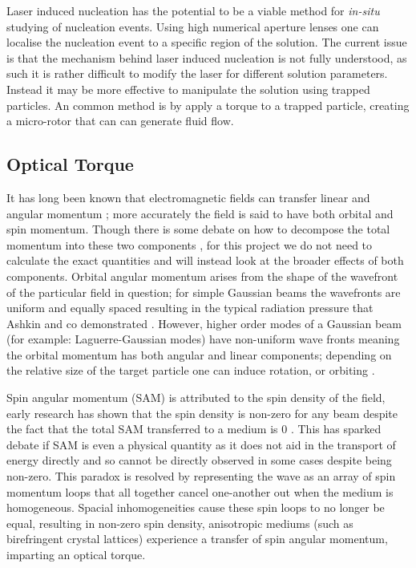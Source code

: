 Laser induced nucleation has the potential to be a viable method 
for \textit{in-situ} studying of nucleation events. Using high 
numerical aperture lenses one can localise the nucleation event 
to a specific region of the solution. The current issue is that 
the mechanism behind laser induced nucleation is not fully 
understood, as such it is rather difficult to modify the laser 
for different solution parameters. Instead it may be more 
effective to manipulate the solution using trapped particles. 
An common method is by apply a torque to a trapped particle, 
creating a micro-rotor that can can generate fluid flow.

\subsection{Optical Torque}
It has long been known that electromagnetic fields can transfer linear and
angular momentum \cite{Beth1936MechanicalDA}; more accurately the field 
is said to have both orbital and spin momentum. Though there is some 
debate on how to decompose the total momentum into these two components 
\cite{Bruce2020, Svak2018}, for this project we do not need to calculate 
the exact quantities and will instead look at the broader effects of both 
components. Orbital angular momentum arises from the shape of the wavefront 
of the particular field in question; for simple Gaussian beams the wavefronts 
are uniform and equally spaced resulting in the typical radiation pressure 
that Ashkin and co demonstrated \cite{Ashkin1980}. However, higher order 
modes of a Gaussian beam (for example: Laguerre-Gaussian modes) have 
non-uniform wave fronts meaning the orbital momentum has both angular and
linear components; depending on the relative size of the target particle 
one can induce rotation, or orbiting \cite{Bruce2020, Courtial2000}. 

Spin angular momentum (SAM) is attributed to the spin density of the field, 
early research has shown that the spin density is non-zero for any beam despite
the fact that the total SAM transferred to a medium is 0 \cite{Svak2018, 
Bliokh2014}. This has sparked debate if SAM is even a physical quantity as 
it does not aid in the transport of energy directly \cite{Bliokh2014} and 
so cannot be directly observed in some cases despite being non-zero. This 
paradox is resolved by representing the wave as an array of spin momentum 
loops that all together cancel one-another out when the medium is homogeneous.
Spacial inhomogeneities cause these spin loops to no longer be equal, resulting
in non-zero spin density, anisotropic mediums (such as birefringent crystal 
lattices) experience a transfer of spin angular momentum, imparting an optical
torque.

